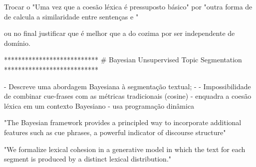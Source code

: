 








Trocar o "Uma vez que a coesão léxica é pressuposto básico" por "outra forma de de calcula a similaridade entre sentenças e "

ou no final justificar que é melhor que a do cozima por ser independente de domínio.














***************************
# Bayesian Unsupervised Topic Segmentation
***************************

- Descreve uma abordagem Bayesiana à segmentação textual;
- 
- Impossibilidade de combinar cue-frases com as métricas tradicionais (cosine)
- {enquadra a coesão léxica em um contexto Bayesiano}
- usa programação dinâmica

"The Bayesian framework provides a principled way to incorporate additional features such as cue phrases, a powerful indicator of discourse structure"


"We formalize lexical cohesion in a generative model in which the text for each segment is produced by a distinct lexical distribution." 

